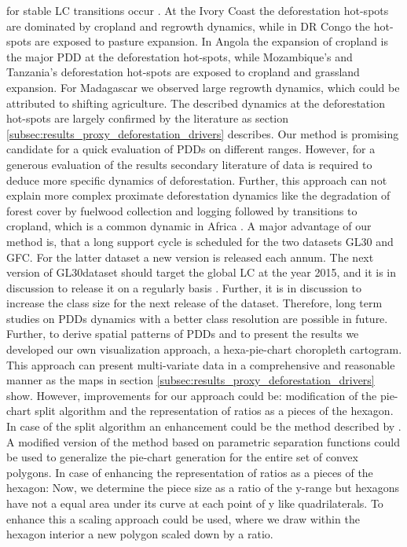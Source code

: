 for stable \ac{LC} transitions occur \citep{Ruf2014,Kideghesho2015,Barima2016,Folefack2019}. At the Ivory Coast the deforestation hot-spots are dominated by cropland and regrowth dynamics, while in DR Congo the hot-spots are exposed to pasture expansion. In Angola the expansion of cropland is the major \ac{PDD} at the deforestation hot-spots, while Mozambique's and Tanzania's deforestation hot-spots are exposed to cropland and grassland expansion. For Madagascar we observed large regrowth dynamics, which could be attributed to shifting agriculture. The described dynamics at the deforestation hot-spots are largely confirmed by the literature as section \ref{subsec:results_proxy_deforestation_drivers} describes. Our method is promising candidate for a quick evaluation of \acp{PDD} on different ranges. However, for a generous evaluation of the results secondary literature of data is required to deduce more specific dynamics of deforestation. Further, this approach can not explain more complex proximate deforestation dynamics like the degradation of forest cover by fuelwood collection and logging followed by transitions to cropland, which is a common dynamic in Africa \cite{Geist2001,Cabral2011}. A major advantage of our method is, that a long support cycle is scheduled for the two datasets \ac{GL30} and \ac{GFC}. For the latter dataset a new version is released each annum. The next version of \ac{GL30}dataset should target the global \ac{LC} at the year 2015, and it is in discussion to release it on a regularly basis \citep{Chen2017}. Further, it is in discussion to increase the class size for the next release of the dataset. Therefore, long term studies on \acp{PDD} dynamics with a better class resolution are possible in future. Further, to derive spatial patterns of \acp{PDD} and to present the results we developed our own visualization approach, a hexa-pie-chart choropleth cartogram. This approach can present multi-variate data in a comprehensive and reasonable manner as the maps in section \ref{subsec:results_proxy_deforestation_drivers} show. However, improvements for our approach could be: modification of the pie-chart split algorithm and the representation of ratios as a pieces of the hexagon. In case of the split algorithm an enhancement could be the method described by \citet{Skala1994}. A modified version of the method based on parametric separation functions could be used to generalize the pie-chart generation for the entire set of convex polygons. In case of enhancing the representation of ratios as a pieces of the hexagon: Now, we determine the piece size as a ratio of the y-range but hexagons have not a equal area under its curve at each point of y like quadrilaterals. To enhance this a scaling approach could be used, where we draw within the hexagon interior a new polygon scaled down by a ratio.

